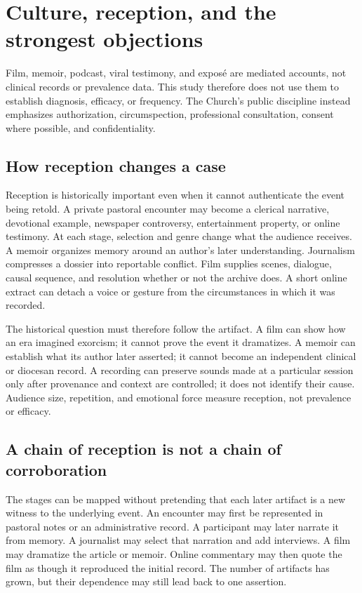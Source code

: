 \section{Culture, reception, and the strongest objections}

Film, memoir, podcast, viral testimony, and exposé are mediated accounts, not
clinical records or prevalence data. This study therefore does not use them to
establish diagnosis, efficacy, or frequency. The Church's public discipline
instead emphasizes authorization, circumspection, professional consultation,
consent where possible, and confidentiality.

\subsection{How reception changes a case}

Reception is historically important even when it cannot authenticate the
event being retold.  A private pastoral encounter may become a clerical
narrative, devotional example, newspaper controversy, entertainment
property, or online testimony.  At each stage, selection and genre change what
the audience receives.  A memoir organizes memory around an author's later
understanding.  Journalism compresses a dossier into reportable conflict.
Film supplies scenes, dialogue, causal sequence, and resolution whether or not
the archive does.  A short online extract can detach a voice or gesture from
the circumstances in which it was recorded.

The historical question must therefore follow the artifact.  A film can show
how an era imagined exorcism; it cannot prove the event it dramatizes.  A
memoir can establish what its author later asserted; it cannot become an
independent clinical or diocesan record.  A recording can preserve sounds
made at a particular session only after provenance and context are
controlled; it does not identify their cause.  Audience size, repetition, and
emotional force measure reception, not prevalence or efficacy.

\subsection{A chain of reception is not a chain of corroboration}

The stages can be mapped without pretending that each later artifact is a new
witness to the underlying event. An encounter may first be represented in
pastoral notes or an administrative record. A participant may later narrate
it from memory. A journalist may select that narration and add interviews. A
film may dramatize the article or memoir. Online commentary may then quote the
film as though it reproduced the initial record. The number of artifacts has
grown, but their dependence may still lead back to one assertion.

